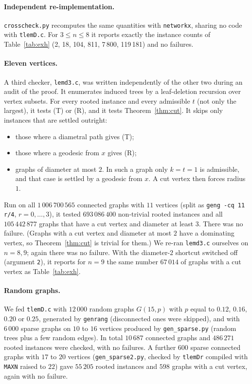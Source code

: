 \documentclass[11pt,a4paper]{article}
\theoremstyle{definition}
\begin{document}
\paragraph{Independent re-implementation.} \texttt{crosscheck.py} recomputes the same quantities with \texttt{networkx}, sharing no code with \texttt{tlemD.c}. For $3\le n\le 8$ it reports exactly the instance counts of Table~\ref{tab:exh} (2, 18, 104, 811, 7\,800, 119\,181) and no failures.

\paragraph{Eleven vertices.} A third checker, \texttt{lemd3.c}, was written independently of the other two during an audit of the proof. It enumerates induced trees by a leaf-deletion recursion over vertex subsets. For every rooted instance and every admissible $t$ (not only the largest), it tests (T) or (R), and it tests Theorem~\ref{thm:cut}. It skips only instances that are settled outright:
\begin{itemize}
\item those where a diametral path gives (T);
\item those where a geodesic from $x$ gives (R);
\item graphs of diameter at most $2$. In such a graph only $k=t=1$ is admissible, and that case is settled by a geodesic from $x$. A cut vertex then forces radius $1$.
\end{itemize}
Run on all $1\,006\,700\,565$ connected graphs with $11$ vertices (split as \verb|geng -cq 11 r/4|, $r=0,\dots,3$), it tested $693\,086\,400$ non-trivial rooted instances and all $105\,442\,877$ graphs that have a cut vertex and diameter at least $3$. There was no failure. (Graphs with a cut vertex and diameter at most $2$ have a dominating vertex, so Theorem~\ref{thm:cut} is trivial for them.) We re-ran \texttt{lemd3.c} ourselves on $n=8,9$; again there was no failure. With the diameter-$2$ shortcut switched off (argument \texttt{2}), it reports for $n=9$ the same number $67\,014$ of graphs with a cut vertex as Table~\ref{tab:exh}.

\paragraph{Random graphs.} We fed \texttt{tlemD.c} with $12\,000$ random graphs $G(15,p)$ with $p$ equal to $0.12$, $0.16$, $0.20$ or $0.25$, generated by \texttt{genrang} (disconnected ones were skipped), and with $6\,000$ sparse graphs on $10$ to $16$ vertices produced by \texttt{gen\_sparse.py} (random trees plus a few random edges). In total $10\,687$ connected graphs and $486\,271$ rooted instances were checked, with no failures. A further $600$ sparse connected graphs with $17$ to $20$ vertices (\texttt{gen\_sparse2.py}, checked by \texttt{tlemDr} compiled with \texttt{MAXN} raised to $22$) gave $55\,205$ rooted instances and $598$ graphs with a cut vertex, again with no failure.
\end{document}
